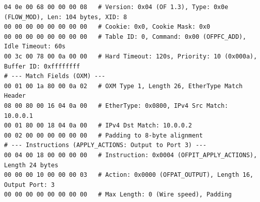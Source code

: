 \begin{lstlisting}[basicstyle=\ttfamily\scriptsize, caption={Annotated Hex Dump of OFPFlowMod Installation Message}, label={lst:flow_mod_hex}]
04 0e 00 68 00 00 00 08   # Version: 0x04 (OF 1.3), Type: 0x0e (FLOW_MOD), Len: 104 bytes, XID: 8
00 00 00 00 00 00 00 00   # Cookie: 0x0, Cookie Mask: 0x0
00 00 00 00 00 00 00 00   # Table ID: 0, Command: 0x00 (OFPFC_ADD), Idle Timeout: 60s
00 3c 00 78 00 0a 00 00   # Hard Timeout: 120s, Priority: 10 (0x000a), Buffer ID: 0xffffffff
# --- Match Fields (OXM) ---
00 01 00 1a 80 00 0a 02   # OXM Type 1, Length 26, EtherType Match Header
08 00 80 00 16 04 0a 00   # EtherType: 0x0800, IPv4 Src Match: 10.0.0.1
00 01 80 00 18 04 0a 00   # IPv4 Dst Match: 10.0.0.2
00 02 00 00 00 00 00 00   # Padding to 8-byte alignment
# --- Instructions (APPLY_ACTIONS: Output to Port 3) ---
00 04 00 18 00 00 00 00   # Instruction: 0x0004 (OFPIT_APPLY_ACTIONS), Length 24 bytes
00 00 00 10 00 00 00 03   # Action: 0x0000 (OFPAT_OUTPUT), Length 16, Output Port: 3
00 00 00 00 00 00 00 00   # Max Length: 0 (Wire speed), Padding
\end{lstlisting}
